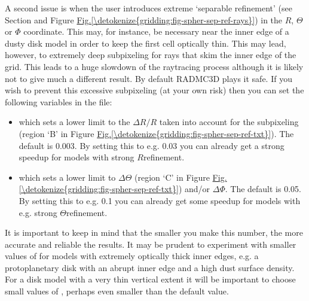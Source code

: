 \documentclass[letterpaper,10pt,english]{sphinxmanual}
\begin{document}
A second issue is when the user introduces extreme ‘separable refinement’
(see Section {\hyperref[\detokenize{gridding:sec-separable-refinement}]{}} and Figure
\hyperref[\detokenize{gridding:fig-spher-sep-ref-rays}]{Fig.\@ \ref{\detokenize{gridding:fig-spher-sep-ref-rays}}}) in the \(R\), \(\Theta\) or \(\Phi\)
coordinate. This may, for instance, be necessary near the inner edge of a
dusty disk model in order to keep the first cell optically thin. This may
lead, however, to extremely deep sub\sphinxhyphen{}pixeling for rays that skim the inner
edge of the grid. This leads to a huge slow\sphinxhyphen{}down of the ray\sphinxhyphen{}tracing process
although it is likely not to give much a different result. By default
RADMC\sphinxhyphen{}3D plays it safe. If you wish to prevent this excessive sub\sphinxhyphen{}pixeling
(at your own risk) then you can set the following variables in the
 file:
\begin{itemize}
\item {} 
 which sets a lower limit to the \(\Delta
R/R\) taken into account for the sub\sphinxhyphen{}pixeling (region ‘B’ in Figure
\hyperref[\detokenize{gridding:fig-spher-sep-ref-txt}]{Fig.\@ \ref{\detokenize{gridding:fig-spher-sep-ref-txt}}}). The default is 0.003. By setting this to
e.g. 0.03 you can already get a strong speed\sphinxhyphen{}up for models with strong
\(R\)\sphinxhyphen{}refinement.

\item {} 
 which sets a lower limit to
\(\Delta\Theta\) (region ‘C’ in Figure \hyperref[\detokenize{gridding:fig-spher-sep-ref-txt}]{Fig.\@ \ref{\detokenize{gridding:fig-spher-sep-ref-txt}}})
and/or \(\Delta\Phi\). The default is 0.05. By setting this to e.g. 0.1 you
can already get some speed\sphinxhyphen{}up for models with e.g. strong
\(\Theta\)\sphinxhyphen{}refinement.

\end{itemize}

It is important to keep in mind that the smaller you make this number, the
more accurate and reliable the results. It may be prudent to experiment with
smaller values of  for models with extremely
optically thick inner edges, e.g. a protoplanetary disk with an abrupt
inner edge and a high dust surface density. For a disk model with a very
thin vertical extent it will be important to choose small values of
, perhaps even smaller than the default
value.
\end{document}
